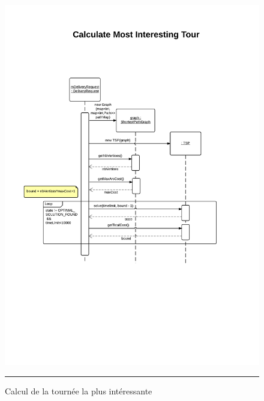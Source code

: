 \begin{figure}[H]
	\centering
		\includegraphics[width=\textwidth,height=\textheight,keepaspectratio]{Figures/calcul_tournee3}
		\rule{35em}{0.5pt}
	\caption[Calcul de la tournée la plus intéressante]{Calcul de la tournée la plus intéressante}
\end{figure}


